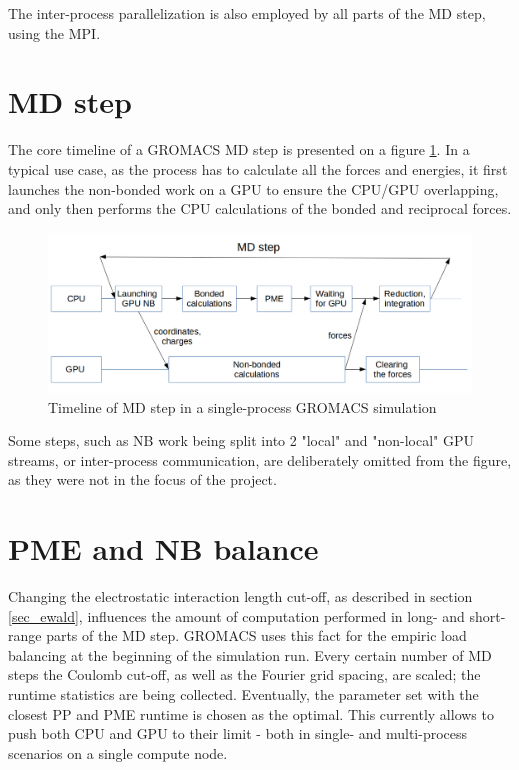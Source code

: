 \documentclass[12pt,a4paper]{report}
\newcommand{\draft}[1]{#1}
\begin{document}
The inter-process parallelization is also employed by all parts of the MD step, using the MPI.

\section{MD step}
\FloatBarrier
The core timeline of a GROMACS MD step is presented on a figure \ref{fig:step-orig}. In a typical use case, as the process has to calculate all the forces and energies, it first launches the non-bonded work on a GPU to ensure the CPU/GPU overlapping, and only then performs the CPU calculations of the bonded and reciprocal forces. 
\begin{figure}
    \centering
    \includegraphics[width=1\textwidth]{pics/mdstep-orig.png}
    \caption{Timeline of MD step in a single-process GROMACS simulation}
    \label{fig:step-orig}
\end{figure}
\FloatBarrier

Some steps, such as NB work being split into 2 "local" and "non-local" GPU streams, or inter-process communication, are deliberately omitted from the figure, as they were not in the focus of the project. 


\section{PME and NB balance} \label{PMEtuning}
Changing the electrostatic interaction length cut-off, as described in section \ref{sec_ewald}, influences the amount of computation performed in long- and short-range parts of the MD step. GROMACS uses this fact for the empiric load balancing at the beginning of the simulation run. Every certain number of MD steps the Coulomb cut-off, as well as the Fourier grid spacing, are scaled; the runtime statistics are being collected. Eventually, the parameter set with the closest \draft{PP} and PME runtime is chosen as the optimal. This currently allows to push both CPU and GPU to their limit - both in single- and multi-process scenarios on a single compute node.
\end{document}
